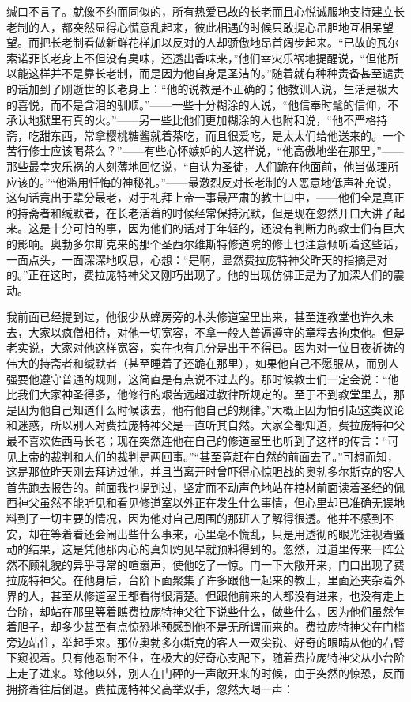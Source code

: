 缄口不言了。就像不约而同似的，所有热爱已故的长老而且心悦诚服地支持建立长老制的人，都突然显得心慌意乱起来，彼此相遇的时候只敢提心吊胆地互相呆望望。而把长老制看做新鲜花样加以反对的人却骄傲地昂首阔步起来。“已故的瓦尔索诺菲长老身上不但没有臭味，还透出香味来，”他们幸灾乐祸地提醒说，“但他所以能这样并不是靠长老制，而是因为他自身是圣洁的。”随着就有种种责备甚至谴责的话加到了刚逝世的长老身上：“他的说教是不正确的；他教训人说，生活是极大的喜悦，而不是含泪的驯顺。”——一些十分糊涂的人说，“他信奉时髦的信仰，不承认地狱里有真的火。”——另一些比他们更加糊涂的人也附和说，“他不严格持斋，吃甜东西，常拿樱桃糖酱就着茶吃，而且很爱吃，是太太们给他送来的。一个苦行修士应该喝茶么？”——有些心怀嫉妒的人这样说，“他高傲地坐在那里，”——那些最幸灾乐祸的人刻薄地回忆说，“自认为圣徒，人们跪在他面前，他当做理所应该的。”“他滥用忏悔的神秘礼。”——最激烈反对长老制的人恶意地低声补充说，这句话竟出于辈分最老，对于礼拜上帝一事最严肃的教士口中，——他们全是真正的持斋者和缄默者，在长老活着的时候经常保持沉默，但是现在忽然开口大讲了起来。这是十分可怕的事，因为他们的话对于年轻的，还没有判断力的教士们有巨大的影响。奥勃多尔斯克来的那个圣西尔维斯特修道院的修士也注意倾听着这些话，一面点头，一面深深地叹息，心想：“是啊，显然费拉庞特神父昨天的指摘是对的。”正在这时，费拉庞特神父又刚巧出现了。他的出现仿佛正是为了加深人们的震动。
\par 我前面已经提到过，他很少从蜂房旁的木头修道室里出来，甚至连教堂也许久未去，大家以疯僧相待，对他一切宽容，不拿一般人普遍遵守的章程去拘束他。但是老实说，大家对他这样宽容，实在也有几分是出于不得已。因为对一位日夜祈祷的伟大的持斋者和缄默者（甚至睡着了还跪在那里），如果他自己不愿服从，而别人强要他遵守普通的规则，这简直是有点说不过去的。那时候教士们一定会说：“他比我们大家神圣得多，他修行的艰苦远超过教律所规定的。至于不到教堂里去，那是因为他自己知道什么时候该去，他有他自己的规律。”大概正因为怕引起这类议论和迷惑，所以别人对费拉庞特神父是一直听其自然。大家全都知道，费拉庞特神父最不喜欢佐西马长老；现在突然连他在自己的修道室里也听到了这样的传言：“可见上帝的裁判和人们的裁判是两回事。”“甚至竟赶在自然的前面去了。”可想而知，这是那位昨天刚去拜访过他，并且当离开时曾吓得心惊胆战的奥勃多尔斯克的客人首先跑去报告的。前面我也提到过，坚定而不动声色地站在棺材前面读着圣经的佩西神父虽然不能听见和看见修道室以外正在发生什么事情，但心里却已准确无误地料到了一切主要的情况，因为他对自己周围的那班人了解得很透。他并不感到不安，却在等着看还会闹出些什么事来，心里毫不慌乱，只是用透彻的眼光注视着骚动的结果，这是凭他那内心的真知灼见早就预料得到的。忽然，过道里传来一阵公然不顾礼貌的异乎寻常的喧嚣声，使他吃了一惊。门一下大敞开来，门口出现了费拉庞特神父。在他身后，台阶下面聚集了许多跟他一起来的教士，里面还夹杂着外界的人，甚至从修道室里都看得很清楚。但跟他前来的人都没有进来，也没有走上台阶，却站在那里等着瞧费拉庞特神父往下说些什么，做些什么，因为他们虽然乍着胆子，却多少甚至有点惊恐地预感到他不是无所谓而来的。费拉庞特神父在门槛旁边站住，举起手来。那位奥勃多尔斯克的客人一双尖锐、好奇的眼睛从他的右臂下窥视着。只有他忍耐不住，在极大的好奇心支配下，随着费拉庞特神父从小台阶上走了进来。除他以外，别人在门砰的一声敞开来的时候，由于突然的惊恐，反而拥挤着往后倒退。费拉庞特神父高举双手，忽然大喝一声：
